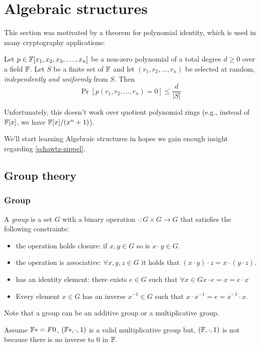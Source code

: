 
\part{Algebraic structures}
This section was motivated by a theorem for polynomial identity, which is used in many cryptography applications:
\begin{lemma} 
\label{schawtz-zippel}
Let $p\in \mathbb{F}[x_1,x_2,x_3,\dots, x_n]$ be a non-zero polynomial of a total 
degree $d\ge0$ over a field $\mathbb{F}$. Let $S$ be a finite set of $\mathbb{F}$ and let 
$(r_1,r_2,\dots,r_n)$ be selected at random, \emph{independently and uniformly} from $S$.
Then 
$$ \Pr{[p(r_1,r_2,\dots,r_n)=0]}\le \frac{d}{|S|}$$
\end{lemma}

Unfortunately, this doesn't work over quotient polynomial rings (e.g., instead of
 $\mathbb{F}[x]$, we have $\mathbb{F}[x]/(x^n+1)$).

We'll start learning Algebraic structures in hopes we gain enough insight regarding \ref{schawtz-zippel}.
\chapter{Group theory}

\section{Group}
\begin{defn}
    A \emph{group} is a set $G$ with a binary operation $\cdot :G\times G\to G$ that satisfies the following constraints:
    \begin{itemize}
        \item the operation holds closure: if $x,y\in G$ so is $x\cdot y\in G$.
        \item the operation is associative: $\forall x,y,z\in G$ it holds that $(x\cdot y)\cdot z = x\cdot (y\cdot z)$.
        \item has an identity element: there exists $e\in G$ such that $\forall x\in G x\cdot e = x = e\cdot x$
        \item Every element $x\in G$ has an inverse $x^{-1}\in G$ such that $x\cdot x^{-1} = e = x^{-1} \cdot x$.
    \end{itemize}
\end{defn}

\begin{remark}
    Note that a group can be an additive group or a multiplicative group.
\end{remark}
\begin{example}
    Assume $\mathbb{F}*=F\\{0}$, $(\mathbb{F}*, \cdot, 1)$ is a valid multiplicative group but,
    $(\mathbb{F}, \cdot, 1)$ is not because there is no inverse to $0$ in $\mathbb{F}$.
\end{example}


